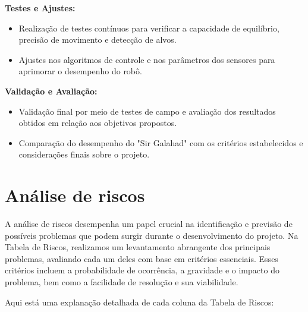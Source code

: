 \textbf{Testes e Ajustes:}
\begin{itemize}
   \item Realização de testes contínuos para verificar a capacidade de equilíbrio, precisão de movimento e detecção de alvos.
   \item Ajustes nos algoritmos de controle e nos parâmetros dos sensores para aprimorar o desempenho do robô.
\end{itemize}

\textbf{Validação e Avaliação:}
\begin{itemize}
   \item Validação final por meio de testes de campo e avaliação dos resultados obtidos em relação aos objetivos propostos.
   \item Comparação do desempenho do "Sir Galahad" com os critérios estabelecidos e considerações finais sobre o projeto.

\end{itemize}

\section{\textbf{Análise de riscos}}
A análise de riscos desempenha um papel crucial na identificação e previsão de possíveis problemas que podem surgir durante o desenvolvimento do projeto. Na Tabela de Riscos, realizamos um levantamento abrangente dos principais problemas, avaliando cada um deles com base em critérios essenciais. Esses critérios incluem a probabilidade de ocorrência, a gravidade e o impacto do problema, bem como a facilidade de resolução e sua viabilidade.

Aqui está uma explanação detalhada de cada coluna da Tabela de Riscos:

